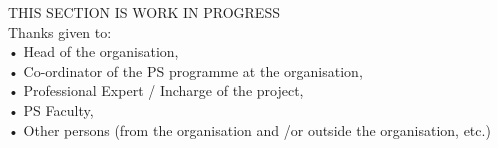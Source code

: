 
THIS SECTION IS WORK IN PROGRESS\\

Thanks given to:\\
• Head of the organisation,\\
• Co-ordinator of the PS programme at the organisation,\\
• Professional Expert / Incharge of the project,\\
• PS Faculty,\\
• Other persons (from the organisation and /or outside the organisation, etc.)\\
